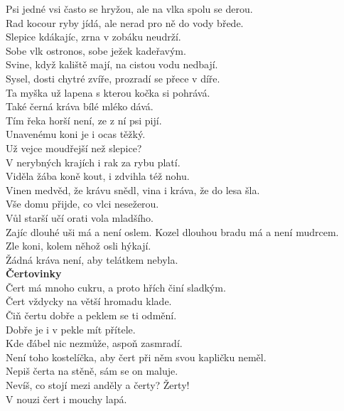 \begin{multicols}{\value{columnsgames}}
Psi jedné vsi často se hryžou, ale na vlka spolu se derou.\\
Rad kocour ryby jídá, ale nerad pro ně do vody břede.\\
Slepice kdákajíc, zrna v zobáku neudrží.\\
Sobe vlk ostronos, sobe ježek kadeřavým.\\
Svine, když kaliště mají, na cistou vodu nedbají.\\
Sysel, dosti chytré zvíře, prozradí se přece v díře.\\
Ta myška už lapena s kterou kočka si pohrává.\\
Také černá kráva bílé mléko dává.\\
Tím řeka horší není, ze z ní psi pijí.\\
Unavenému koni je i ocas těžký.\\
Už vejce moudřejší než slepice?\\
V nerybných krajích i rak za rybu platí.\\
Viděla žába koně kout, i zdvihla též nohu.\\
Vinen medvěd, že krávu snědl, vina i kráva, že do lesa šla.\\
Vše domu přijde, co vlci nesežerou.\\
Vůl starší učí orati vola mladšího.\\
Zajíc dlouhé uši má a není oslem. Kozel dlouhou bradu má a není
mudrcem.\\
Zle koni, kolem něhož osli hýkají.\\
Žádná kráva není, aby telátkem nebyla.\\

\noindent
{\large\bf Čertovinky}\\[1 mm]
Čert má mnoho cukru, a proto hřích činí sladkým.\\
Čert vždycky na větší hromadu klade.\\
Čiň čertu dobře a peklem se ti odmění.\\
Dobře je i v pekle mít přítele.\\
Kde ďábel nic nezmůže, aspoň zasmradí.\\
Není toho kostelíčka, aby čert při něm svou kapličku neměl.\\
Nepiš čerta na stěně, sám se on maluje.\\
Nevíš, co stojí mezi anděly a čerty? Žerty!\\
V nouzi čert i mouchy lapá.\\


\end{multicols}
